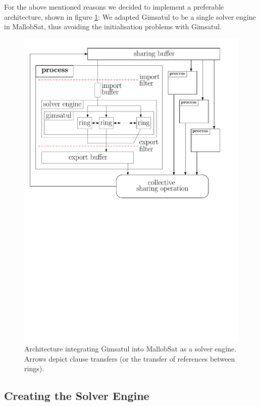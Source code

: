 \documentclass[12pt,a4paper,twoside]{scrartcl}
\numberwithin{equation}{section}
\begin{document}
For the above mentioned reasons we decided to implement a preferable architecture, shown in figure \ref{fig:architecture}: We adapted Gimsatul to be a single solver engine in MallobSat, thus avoiding the initialisation problems with Gimsatul.

\begin{figure}
  \center
  \includegraphics[scale=.8]{figures/architecture.pdf}
  \caption{Architecture integrating Gimsatul into MallobSat as a solver engine. Arrows depict clause transfers (or the transfer of references between rings).}
  \label{fig:architecture}
\end{figure}

\subsection{Creating the Solver Engine}
\end{document}
